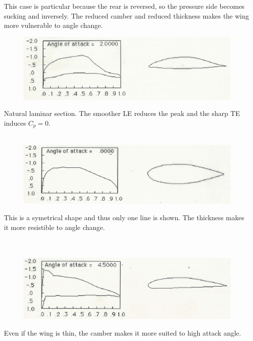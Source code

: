 			This case is particular because the rear is reversed, so the pressure side becomes sucking and inversely. The reduced camber and reduced thickness makes the wing more vulnerable to angle change.
			
			\begin{figure}
			\vspace{-5mm}
			\includegraphics[scale=0.4]{ch2/6}
			\end{figure}
			Natural laminar section. The smoother LE reduces the peak and the sharp TE induces $C_p = 0$.\\\\
			
			\begin{figure}
			\vspace{-5mm}
			\includegraphics[scale=0.4]{ch2/8}
			\end{figure}
			This is a symetrical shape and thus only one line is shown. The thickness makes it more resistible to angle change. \\\\\\
			
			\begin{figure}
			\vspace{-5mm}
			\includegraphics[scale=0.4]{ch2/9}
			\end{figure}
			Even if the wing is thin, the camber makes it more suited to high attack angle. \\\\\\
		
